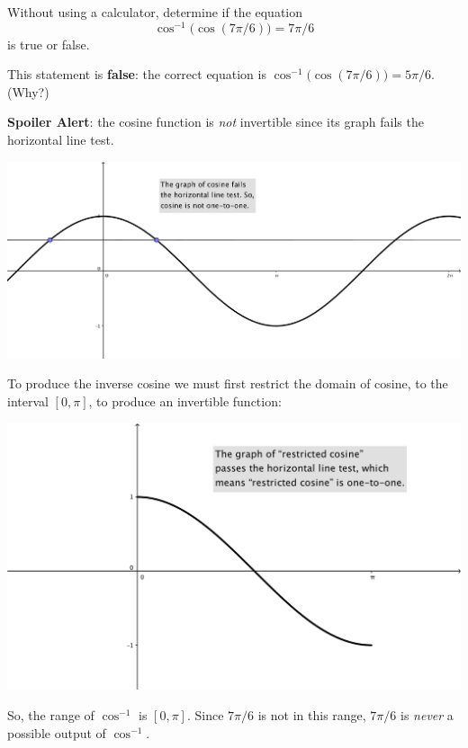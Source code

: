 \documentclass[nooutcomes]{ximera}
\begin{document}
\begin{problem}
 Without using a calculator, determine if the equation
  \[
    \cos^{-1}\bigl(\cos(7\pi/6)\bigr) = 7\pi/6
  \]
  is true or false.
  \begin{freeResponse}
    This statement is \textbf{false}: the correct equation is $\cos^{-1}\bigl(\cos(7\pi/6)\bigr) = 5\pi/6$. (Why?)

    \textbf{Spoiler Alert}: the cosine function is \emph{not} invertible since its graph fails the horizontal line test.
    \begin{image}
      \includegraphics[scale = 0.8]{figure1.png}
    \end{image}
    To produce the inverse cosine we must first restrict the domain of cosine, to the interval $[0, \pi]$, to produce an invertible function:
    \begin{image}
      \includegraphics[scale = 0.8]{figure2.png}
    \end{image}
    So, the range of $\cos^{-1}$ is $[0, \pi]$.
    Since $7\pi/6$ is not in this range, $7\pi/6$ is \emph{never} a possible output of $\cos^{-1}$.
  \end{freeResponse}
\end{problem}
\end{document}
